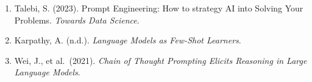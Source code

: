 \documentclass[
]{agujournal2019}
\providecommand{\tightlist}{%
  \setlength{\itemsep}{0pt}\setlength{\parskip}{0pt}}\usepackage{longtable,booktabs,array}
\begin{document}
\begin{enumerate}
\def\labelenumi{\arabic{enumi}.}
\tightlist
\item
  Talebi, S. (2023). Prompt Engineering: How to strategy AI into Solving
  Your Problems. \emph{Towards Data Science}.
\item
  Karpathy, A. (n.d.). \emph{Language Models as Few-Shot Learners}.
\item
  Wei, J., et al.~(2021). \emph{Chain of Thought Prompting Elicits
  Reasoning in Large Language Models}.
\end{enumerate}
\end{document}
